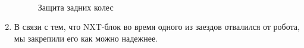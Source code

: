 \begin{enumerate}
	\begin{figure}[H]
		\begin{minipage}[h]{0.2\linewidth}
			\center  
		\end{minipage}
		\begin{minipage}[h]{0.6\linewidth}
			\caption{Защита задних колес}
		\end{minipage}
	\end{figure}
	
	\item В связи с тем, что NXT-блок во время одного из заездов отвалился от робота, мы закрепили его как можно надежнее.
	

\end{enumerate}
